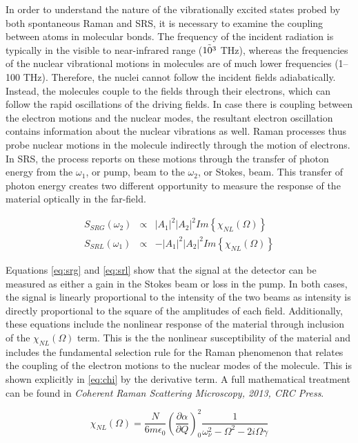 In order to understand the nature of the vibrationally excited states probed by both spontaneous Raman and SRS, it is necessary to examine the coupling between atoms in molecular bonds. The frequency of the incident radiation is typically in the visible to near-infrared range ($\Tilde{10^3}$ THz), whereas the frequencies of the nuclear vibrational motions in molecules are of much lower frequencies (1–100 THz). Therefore, the nuclei cannot follow the incident fields adiabatically. Instead, the molecules couple to the fields through their electrons, which can follow the rapid oscillations of the driving fields. In case there is coupling between the electron motions and the nuclear modes, the resultant electron oscillation contains information about the nuclear vibrations as well. Raman processes thus probe nuclear motions in the molecule indirectly through the motion of electrons. In SRS, the process reports on these motions through the transfer of photon energy from the $\omega_1$, or pump, beam to the $\omega_2$, or Stokes, beam. This transfer of photon energy creates two different opportunity to measure the response of the material optically in the far-field.  

\begin{eqnarray}
S_{SRG}(\omega_2)&\propto&\left|A_1\right|^2\left|A_2\right|^2Im\left\{\chi_{NL}(\Omega)\right\}\label{eq:srg}\\
S_{SRL}(\omega_1)&\propto&-\left|A_1\right|^2\left|A_2\right|^2 Im\left\{\chi_{NL}(\Omega)\right\}\label{eq:srl}
\end{eqnarray}  

Equations \ref{eq:srg} and \ref{eq:srl} show that the signal at the detector can be measured as either a gain in the Stokes beam or loss in the pump.  In both cases, the signal is linearly proportional to the intensity of the two beams as intensity is directly proportional to the square of the amplitudes of each field.  Additionally, these equations include the nonlinear response of the material through inclusion of the $\chi_{NL} (\Omega)$ term.  This is the the nonlinear susceptibility of the material and includes the fundamental selection rule for the Raman phenomenon that relates the coupling of the electron motions to the nuclear modes of the molecule.   This is shown explicitly in \ref{eq:chi} by the derivative term.  A full mathematical treatment can be found in \textit{Coherent Raman Scattering Microscopy, 2013, CRC Press}.\cite{Potma:2013aa}


\begin{equation}
\chi_{NL}(\Omega)=\frac{N}{6m\epsilon_0}\left(\frac{\partial\alpha}{\partial Q}\right)^2_0 \frac{1}{\omega^2_\nu-\Omega^2-2i\Omega\gamma}\label{eq:chi}
\end{equation}



